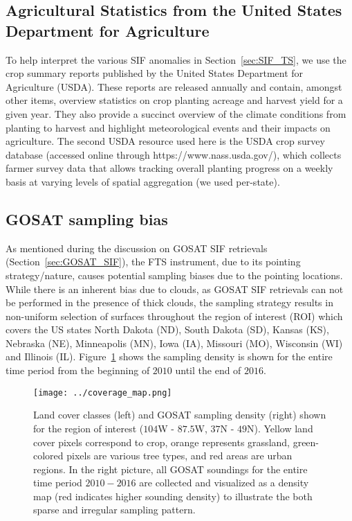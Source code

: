 \documentclass[preprint, a4paper, 10pt, times, 5p]{elsarticle}
\begin{document}
\subsection{Agricultural Statistics from the United States Department for Agriculture}
\label{sec:usda}
To help interpret the various SIF anomalies in Section~\ref{sec:SIF_TS}, we use the crop summary reports published by the United States Department for Agriculture (USDA). These reports are released annually and contain, amongst other items, overview statistics on crop planting acreage and harvest yield for a given year. They also provide a succinct overview of the climate conditions from planting to harvest and highlight meteorological events and their impacts on agriculture. The second USDA resource used here is the USDA crop survey database (accessed online through https://www.nass.usda.gov/), which collects farmer survey data that allows tracking overall planting progress on a weekly basis at varying levels of spatial aggregation (we used per-state).

\subsection{GOSAT sampling bias}
\label{sec:sampling_bias}

As mentioned during the discussion on GOSAT SIF retrievals (Section~\ref{sec:GOSAT_SIF}), the FTS instrument, due to its pointing strategy/nature, causes potential sampling biases due to the pointing locations. While there is an inherent bias due to clouds, as GOSAT SIF retrievals can not be performed in the presence of thick clouds, the sampling strategy results in non-uniform selection of surfaces throughout the region of interest (ROI) which covers the US states North Dakota (ND), South Dakota (SD), Kansas (KS), Nebraska (NE), Minneapolis (MN), Iowa (IA), Missouri (MO), Wisconsin (WI) and Illinois (IL). Figure~\ref{fig:sampling} shows the sampling density is shown for the entire time period from the beginning of $2010$ until the end of $2016$. 

\begin{figure}[htbp]
\centering
\texttt{[image: ../coverage\_map.png]}
\caption{Land cover classes (left) and GOSAT sampling density (right) shown for the region of interest ($104$W - $87.5$W, $37$N - $49$N). Yellow land cover pixels correspond to crop, orange represents grassland, green-colored pixels are various tree types, and red areas are urban regions. In the right picture, all GOSAT soundings for the entire time period $2010-2016$ are collected and visualized as a density map (red indicates higher sounding density) to illustrate the both sparse and irregular sampling pattern.}
\label{fig:sampling}
\end{figure}
\end{document}
